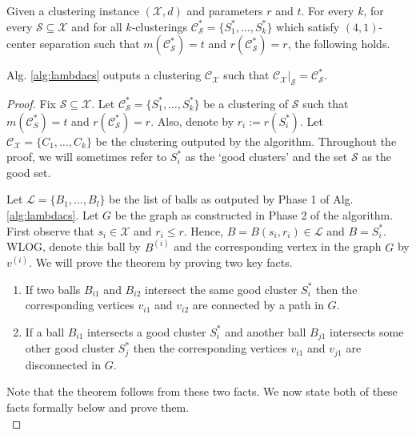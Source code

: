 \documentclass[anon,12pt]{colt2016} %
\newcommand{\mc}{\mathcal}
\begin{document}
\begin{theorem}
\label{thm:lambdacsnoise}
Given a clustering instance $(\mc X, d)$ and parameters $r$ and $t$. For every $k$, for every $\mc S \subseteq \mc X$ and for all $k$-clusterings $\mc C^*_{\mc S} = \{S_1^*, \ldots, S_k^*\}$ which satisfy $(4, 1)$-center separation such that $ m(\mc C_{\mc S}^*) = t$ and $r(\mc C_{\mc S}^*) = r$, the following holds.

Alg. \ref{alg:lambdacs} outputs a clustering $\mc C_{\mc X}$ such that $\mc C_{\mc X}|_{\mc S} = \mc C_{\mc S}^*$.
\end{theorem}
\begin{proof}
Fix $\mc S \subseteq \mc X$. Let $\mc C_{\mc S}^* = \{S_1^*, \ldots, S_k^*\}$ be a clustering of $\mc S$ such that $m( \mc C_{S}^*) = t$ and $r(\mc C_{\mc S}^*) = r$. Also, denote by $r_i := r(S_i^*)$. Let $\mc C_{\mc X} = \{C_1, \ldots, C_k\}$ be the clustering outputed by the algorithm. Throughout the proof, we will sometimes refer to $S_i^*$ as the `good clusters' and the set $\mc S$ as the good set.

Let $\mc L = \{B_1, \ldots, B_l\}$ be the list of balls as outputed by Phase 1 of Alg. \ref{alg:lambdacs}. Let $G$ be the graph as constructed in Phase 2 of the algorithm. First observe that $s_i \in \mc X$ and $r_i \le r$. Hence, $B = B(s_i, r_i) \in \mc L$ and $B = S_i^*$. WLOG, denote this ball by $B^{(i)}$ and the corresponding vertex in the graph $G$ by $v^{(i)}$. We will prove the theorem by proving two key facts.  

\begin{enumerate}[nolistsep, noitemsep, label=\textbf{F.\arabic*}]
\renewcommand\labelitemi{$\diamond$}
\item \label{fact:lambda1} If two balls $B_{i1}$ and $B_{i2}$ intersect the same good cluster $S_i^*$ then the corresponding vertices $v_{i1}$ and $v_{i2}$ are connected by a path in $G$.
\item \label{fact:lambda2} If a ball $B_{i1}$ intersects a good cluster $S_i^*$ and another ball $B_{j1}$ intersects some other good cluster $S_j^*$ then the corresponding vertices $v_{i1}$ and $v_{j1}$ are disconnected in $G$.	
\end{enumerate}
Note that the theorem follows from these two facts. We now state both of these facts formally below and prove them.\\


\end{proof}
\end{document}

